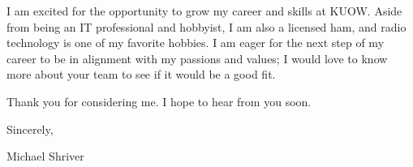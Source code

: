 \documentclass[10pt,oneside]{article}
\begin{document}
\vspace{\baselineskip}

I am excited for the opportunity to grow my career and skills at KUOW. Aside from being an IT professional and hobbyist, I am also a licensed ham, and radio technology is one of my favorite hobbies. I am eager for the next step of my career to be in alignment with my passions and values; I would love to know more about your team to see if it would be a good fit.

\vspace{\baselineskip}

Thank you for considering me. I hope to hear from you soon.

\vspace{\baselineskip}

Sincerely,

\vspace{\baselineskip}

Michael Shriver
\end{document}
